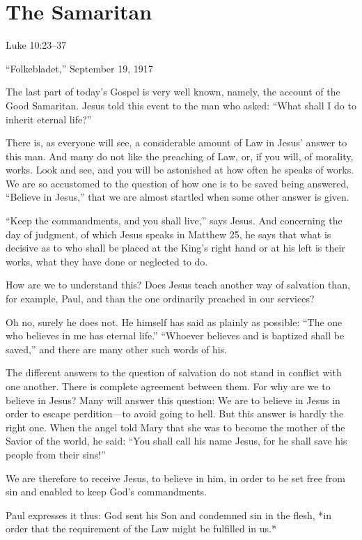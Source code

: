 
\section{The Samaritan}

Luke 10:23–37

“Folkebladet,” September 19, 1917


The last part of today’s Gospel is very well known, namely, the account of the Good Samaritan. Jesus told this event to the man who asked: “What shall I do to inherit eternal life?”

There is, as everyone will see, a considerable amount of Law in Jesus’ answer to this man. And many do not like the preaching of Law, or, if you will, of morality, works. Look and see, and you will be astonished at how often he speaks of works. We are so accustomed to the question of how one is to be saved being answered, “Believe in Jesus,” that we are almost startled when some other answer is given.

“Keep the commandments, and you shall live,” says Jesus. And concerning the day of judgment, of which Jesus speaks in Matthew 25, he says that what is decisive as to who shall be placed at the King’s right hand or at his left is their works, what they have done or neglected to do.

How are we to understand this? Does Jesus teach another way of salvation than, for example, Paul, and than the one ordinarily preached in our services?

Oh no, surely he does not. He himself has said as plainly as possible: “The one who believes in me has eternal life.” “Whoever believes and is baptized shall be saved,” and there are many other such words of his.

The different answers to the question of salvation do not stand in conflict with one another. There is complete agreement between them. For why are we to believe in Jesus? Many will answer this question: We are to believe in Jesus in order to escape perdition—to avoid going to hell. But this answer is hardly the right one. When the angel told Mary that she was to become the mother of the Savior of the world, he said: “You shall call his name Jesus, for he shall save his people from their sins!”

We are therefore to receive Jesus, to believe in him, in order to be set free from sin and enabled to keep God’s commandments.

Paul expresses it thus: God sent his Son and condemned sin in the flesh, *in order that the requirement of the Law might be fulfilled in us.*

